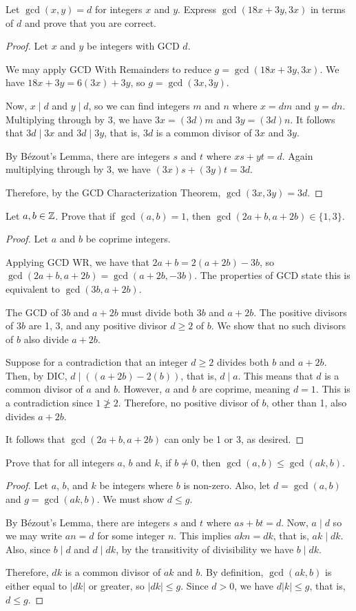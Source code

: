 \question Let $\gcd(x, y) = d$ for integers $x$ and $y$.
Express $\gcd(18x + 3y, 3x)$ in terms of $d$ and prove that you are correct.
\begin{proof}
  Let $x$ and $y$ be integers with GCD $d$.
  
  We may apply GCD With Remainders to reduce $g=\gcd(18x+3y,3x)$.
  We have $18x+3y = 6(3x) + 3y$, so $g=\gcd(3x,3y)$.

  Now, $x \mid d$ and $y \mid d$, so we can find integers $m$ and $n$ where $x = dm$ and $y = dn$.
  Multiplying through by 3, we have $3x = (3d)m$ and $3y = (3d)n$.
  It follows that $3d \mid 3x$ and $3d \mid 3y$, that is, $3d$ is a common divisor of $3x$ and $3y$.

  By Bézout's Lemma, there are integers $s$ and $t$ where $xs+yt=d$.
  Again multiplying through by 3, we have $(3x)s+(3y)t=3d$.

  Therefore, by the GCD Characterization Theorem, $\gcd(3x,3y) = 3d$.
\end{proof}


\question Let $a,b\in\mathbb{Z}$. Prove that if $\gcd(a, b) = 1$, then $\gcd(2a+b, a+2b) \in \{1,3\}$.
\begin{proof}
  Let $a$ and $b$ be coprime integers.

  Applying GCD WR, we have that $2a+b = 2(a+2b)-3b$, so $\gcd(2a+b,a+2b)=\gcd(a+2b,-3b)$.
  The properties of GCD state this is equivalent to $\gcd(3b,a+2b)$.

  The GCD of $3b$ and $a+2b$ must divide both $3b$ and $a+2b$.
  The positive divisors of $3b$ are 1, 3, and any positive divisor $d \geq 2$ of $b$.
  We show that no such divisors of $b$ also divide $a+2b$.

  Suppose for a contradiction that an integer $d \geq 2$ divides both $b$ and $a+2b$.
  Then, by DIC, $d \mid ((a+2b)-2(b))$, that is, $d \mid a$.
  This means that $d$ is a common divisor of $a$ and $b$.
  However, $a$ and $b$ are coprime, meaning $d=1$.
  This is a contradiction since $1 \not\geq 2$.
  Therefore, no positive divisor of $b$, other than 1, also divides $a+2b$.

  It follows that $\gcd(2a+b,a+2b)$ can only be 1 or 3, as desired.
\end{proof}


\question Prove that for all integers $a$, $b$ and $k$, if $b \neq 0$, then $\gcd(a, b) \leq \gcd(ak, b)$.
\begin{proof}
  Let $a$, $b$, and $k$ be integers where $b$ is non-zero.
  Also, let $d=\gcd(a,b)$ and $g=\gcd(ak,b)$. We must show $d \leq g$.

  By Bézout's Lemma, there are integers $s$ and $t$ where $as+bt=d$.
  Now, $a \mid d$ so we may write $an = d$ for some integer $n$.
  This implies $akn=dk$, that is, $ak \mid dk$.
  Also, since $b \mid d$ and $d \mid dk$, by the transitivity of divisibility we have $b \mid dk$.

  Therefore, $dk$ is a common divisor of $ak$ and $b$.
  By definition, $\gcd(ak,b)$ is either equal to $|dk|$ or greater, so $|dk| \leq g$.
  Since $d > 0$, we have $d|k| \leq g$, that is, $d \leq g$.
\end{proof}



